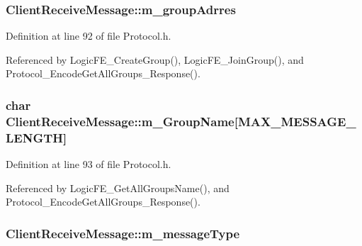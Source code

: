\subsubsection[{\texorpdfstring{m\+\_\+group\+Adrres}{m_groupAdrres}}]{ Client\+Receive\+Message\+::m\+\_\+group\+Adrres}\hypertarget{structClientReceiveMessage_aab3b16d0d269ab80b4511c8aa0e70b2d}{}\label{structClientReceiveMessage_aab3b16d0d269ab80b4511c8aa0e70b2d}


Definition at line 92 of file Protocol.\+h.



Referenced by Logic\+F\+E\+\_\+\+Create\+Group(), Logic\+F\+E\+\_\+\+Join\+Group(), and Protocol\+\_\+\+Encode\+Get\+All\+Groups\+\_\+\+Response().

\subsubsection[{\texorpdfstring{m\+\_\+\+Group\+Name}{m_GroupName}}]{\setlength{\rightskip}{0pt plus 5cm}char Client\+Receive\+Message\+::m\+\_\+\+Group\+Name\mbox{[}{\bf M\+A\+X\+\_\+\+M\+E\+S\+S\+A\+G\+E\+\_\+\+L\+E\+N\+G\+TH}\mbox{]}}\hypertarget{structClientReceiveMessage_a5515f09efee781b16d62940a8ece5cd7}{}\label{structClientReceiveMessage_a5515f09efee781b16d62940a8ece5cd7}


Definition at line 93 of file Protocol.\+h.



Referenced by Logic\+F\+E\+\_\+\+Get\+All\+Groups\+Name(), and Protocol\+\_\+\+Encode\+Get\+All\+Groups\+\_\+\+Response().

\subsubsection[{\texorpdfstring{m\+\_\+message\+Type}{m_messageType}}]{ Client\+Receive\+Message\+::m\+\_\+message\+Type}\hypertarget{structClientReceiveMessage_a9e16d9d8c949b34fe62b61907ed2a009}{}\label{structClientReceiveMessage_a9e16d9d8c949b34fe62b61907ed2a009}


